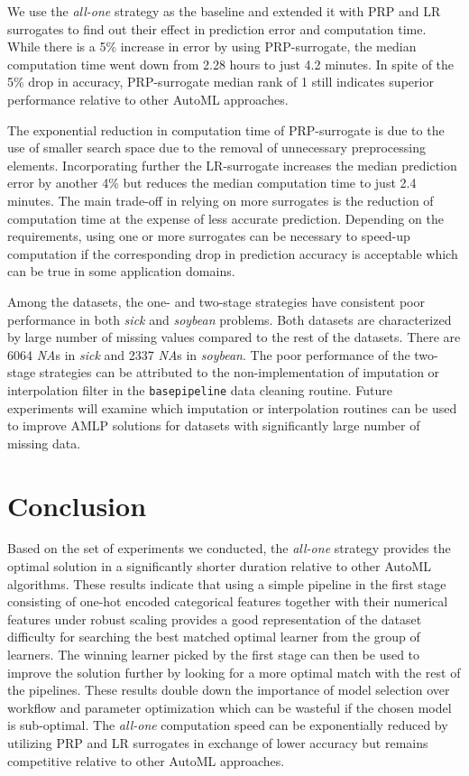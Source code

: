 \documentclass{juliacon}
\begin{document}
\vskip 6pt

We use the \emph{all-one} strategy as the baseline and extended it with 
PRP and LR surrogates to find out their effect in prediction error
and computation time. While there is a 5\% increase in error by
using PRP-surrogate, the median computation time went down from 2.28
hours to just 4.2 minutes. In spite of the 5\% drop in accuracy,
PRP-surrogate median rank of 1 still indicates superior performance
relative to other AutoML approaches.

\vskip 6pt

The exponential reduction in computation time of PRP-surrogate 
is due to the use of smaller search space due to the removal of unnecessary 
preprocessing elements. Incorporating further the LR-surrogate
increases the median prediction error by another 4\% 
but reduces the median computation time to just 2.4 minutes. 
The main trade-off in relying on more surrogates is the reduction of 
computation time at the expense of less accurate prediction. 
Depending on the requirements, using one or more surrogates 
can be necessary to speed-up computation if the corresponding drop in 
prediction accuracy is acceptable which can be true in some 
application domains.

\vskip 6pt

Among the datasets, the one- and two-stage strategies have consistent poor performance in
both \emph{sick} and \emph{soybean} problems.  Both datasets are characterized
by large number of missing values compared to the rest of the datasets.
There are 6064 \emph{NA}s in \emph{sick} and 2337 \emph{NA}s in
\emph{soybean}. The poor performance of the two-stage strategies
can be attributed to the non-implementation of imputation or
interpolation filter in the \texttt{basepipeline} data
cleaning routine. Future experiments
will examine which imputation or interpolation routines
can be used to improve AMLP solutions for datasets with significantly
large number of missing data.

\section{Conclusion}

Based on the set of experiments we conducted, 
the \emph{all-one} strategy provides the optimal solution in 
a significantly shorter duration relative to other
AutoML algorithms. These results indicate that using a simple pipeline
in the first stage consisting of one-hot encoded categorical 
features together with their numerical features
under robust scaling provides a good representation of the dataset difficulty
for searching the best matched optimal learner from the group of learners.
The winning learner picked by the first stage can then be used to improve the
solution further by looking for a more optimal match with the rest of the
pipelines. These results double down the importance of model selection over workflow
and parameter optimization which can be wasteful if the chosen model is sub-optimal.
The \emph{all-one}  computation speed can be exponentially 
reduced by utilizing PRP and LR surrogates in exchange of lower accuracy
but remains competitive relative to other AutoML approaches.
\end{document}

